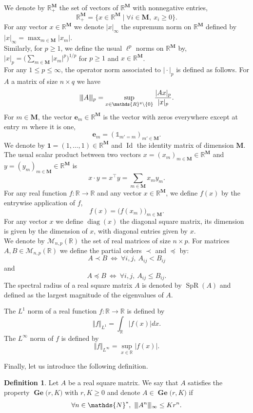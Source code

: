 \documentclass[reqno,final,11pt]{amsart}
\theoremstyle{plain}
\theoremstyle{definition}
\newtheorem{definition}[theorem]{Definition}
\theoremstyle{remark}
\newcommand{\R}{\mathds{R}}
\newcommand{\N}{\mathds{N}}
\newcommand{\ind}{\mathds{1}}
\newcommand{\itg}{\displaystyle\int}
\newcommand{\M}{\bm{M}}
\newcommand{\Ma}{\mathcal{M}}
\newcommand{\Ge}[2]{\bm{\Gel(} #1,#2 \bm{)} }
\newcommand{\ones}{\bm{1}}
\newcommand{\e}{\bm{e}}
\newcommand{\Vone}[1]{\Vert #1 \Vert_{L^1}}
\newcommand{\Vity}[1]{\Vert #1 \Vert_{L^{\infty}}}
\newcommand{\pos}{\R_+^{\M}}
\newcommand{\Vvert}{\vert \hspace{-1pt} \vert \hspace{-1pt} \vert}
\newcommand{\trp}{^{\intercal}}
\DeclareMathOperator{\diag}{diag}
\DeclareMathOperator{\spr}{SpR}
\DeclareMathOperator{\Gel}{Ge}
\DeclareMathOperator{\Id}{Id}
\begin{document}
We denote by $\pos$ the set of vectors of $\R^{\M}$ with nonnegative entries,
\[\pos = \big\{x\in\R^{\M} \mid \forall i\in\M, \ x_i \geq  0\big\}.\]
For any vector $x\in\R^{\M}$ we denote $\vert x \vert_{\infty}$ the supremum norm on $\R^{\M}$ defined by $\vert x\vert_{\infty} = \max_{m\in\M} \vert x_m\vert$.\\
Similarly, for $p\ge1$, we define the usual $\ell^p$ norms on $\R^{\M}$ by, $\vert x\vert_p = \big(\sum_{m\in\M} \vert x_m\vert^p\big)^{1/p}$ for $p\geq 1$ and $x\in\R^{\M}$.\\
For any $1\leq p\leq \infty$, the operator norm associated to $\vert \cdot\vert_{p}$ is defined as follows. For $A$ a matrix of size $n\times q$ we have
\[\Vvert A \Vvert_{p} = \sup_{x\in\R^q\setminus \{0\}} \frac{\vert Ax\vert_{p}}{\vert x\vert_{p}}.\]
For $m\in\M$, the vector $\e_m\in\R^{\M}$ is the vector with zeros everywhere except at entry $m$ where it is one,
\[\e_m = (\ind_{m'=m})_{m'\in\M}.\] 
We denote by $\ones = (1,\ldots,1)\in\R^{\M}$ and $\Id$ the identity matrix of dimension $\M$.\\
The usual scalar product between two vectors $x = (x_m)_{m\in\M}\in\R^{\M}$ and $y=(y_m)_{m\in\M}\in\R^{\M}$ is
\[x \cdot y = x\trp y = \sum_{m\in\M} x_m y_m.\]
For any real function $f:\R\to\R$ and any vector $x\in\R^{\M}$, we define $f(x)$ by the entrywise application of $f$,
\[f(x)=\big(f(x_m)\big)_{m\in\M}.\]
For any vector $x$ we define $\diag(x)$ the diagonal square matrix, its dimension is given by the dimension of $x$, with diagonal entries given by $x$.\\
We denote by $\Ma_{n,p}(\R)$ the set of real matrices of size $n\times p$. For matrices $A,B\in\Ma_{n,p}(\R)$ we define the partial orders $\prec$ and $\preceq$ by:
\[ A \prec B \ \Leftrightarrow \ \forall i,j, \ A_{ij} < B_{ij}\]
and 
\[A \preceq B \ \Leftrightarrow \ \forall i,j, \ A_{ij} \leq  B_{ij}.\]
The spectral radius of a real square matrix $A$ is denoted by $\spr(A)$ and defined as the largest magnitude of the eigenvalues of $A$. 

The $L^1$ norm of a real function $f:\R\longrightarrow\R$ is defined by
\[ \Vone{f} = \itg_{\R} \vert f(x)\vert dx.\]
The $L^{\infty}$ norm of $f$ is defined by
\[\Vity{f} = \sup_{x\in\R} \vert f(x)\vert.\]

Finally, let us introduce the following definition.
\begin{definition}\label{GE}
    Let $A$ be a real square matrix. We say that $A$ satisfies the property $\Ge{r}{K}$ with $r,K\geq 0$ and denote $A\in\Ge{r}{K}$ if
    \begin{equation*}
        \forall n\in\N^*, \ \Vvert A^n \Vvert_{\infty} \leq Kr^n.
    \end{equation*}
\end{definition}
\end{document}
